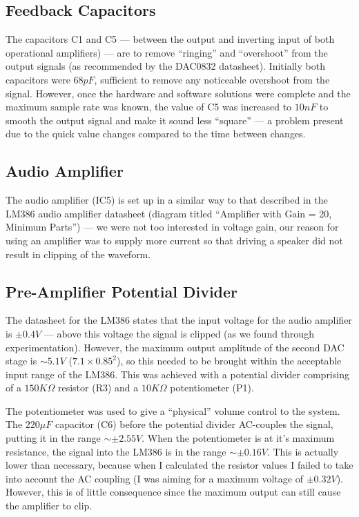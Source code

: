 \subsection{Feedback Capacitors}

The capacitors C1 and C5 --- between the output and inverting input of both operational amplifiers) 
--- are to remove ``ringing'' and ``overshoot'' from the output signals (as recommended by the 
DAC0832 datasheet\cite{dac0832}).  Initially both capacitors were $68pF$, sufficient to remove any 
noticeable overshoot from the signal.  However, once the hardware and software solutions were 
complete and the maximum sample rate was known, the value of C5 was increased to $10nF$ to smooth 
the output signal and make it sound less ``square'' --- a problem present due to the quick value 
changes compared to the time between changes.

\subsection{Audio Amplifier}

The audio amplifier (IC5) is set up in a similar way to that described in the LM386 audio amplifier 
datasheet\cite{lm386} (diagram titled ``Amplifier with Gain = 20, Minimum Parts'') --- we were not 
too interested in voltage gain, our reason for using an amplifier was to supply more current so that 
driving a speaker did not result in clipping of the waveform.

\subsection{Pre-Amplifier Potential Divider}

The datasheet for the LM386\cite{lm386} states that the input voltage for the audio amplifier is 
$\pm0.4V$ --- above this voltage the signal is clipped (as we found through experimentation).  
However, the maximum output amplitude of the second DAC stage is $\sim5.1V$ ($7.1\times0.85^2$), so 
this needed to be brought within the acceptable input range of the LM386.  This was achieved with a 
potential divider comprising of a $150K\Omega$ resistor (R3) and a $10K\Omega$ potentiometer (P1).  

The potentiometer was used to give a ``physical'' volume control to the system.  The $220\mu{}F$ 
capacitor (C6) before the potential divider AC-couples the signal, putting it in the range 
$\sim\pm2.55V$.  When the potentiometer is at it's maximum resistance, the signal into the LM386 is 
in the range $\sim\pm0.16V$.  This is actually lower than necessary, because when I calculated the 
resistor values I failed to take into account the AC coupling (I was aiming for a maximum voltage of 
$\pm0.32V$).  However, this is of little consequence since the maximum output can still cause the 
amplifier to clip.


